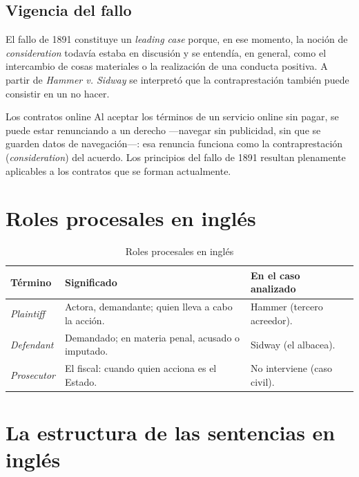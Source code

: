 \documentclass[12pt,oneside]{book}
\begin{document}
\subsection{Vigencia del fallo}

El fallo de 1891 constituye un \textit{leading case} porque, en ese momento, la noción de \textit{consideration} todavía estaba en discusión y se entendía, en general, como el intercambio de cosas materiales o la realización de una conducta positiva. A partir de \textit{Hammer v. Sidway} se interpretó que la contraprestación también puede consistir en un no hacer.

\begin{example}{Los contratos online}
Al aceptar los términos de un servicio online sin pagar, se puede estar renunciando a un derecho ---navegar sin publicidad, sin que se guarden datos de navegación---: esa renuncia funciona como la contraprestación (\textit{consideration}) del acuerdo. Los principios del fallo de 1891 resultan plenamente aplicables a los contratos que se forman actualmente.
\end{example}

\section{Roles procesales en inglés}

\begin{table}[H]
\centering
\caption{Roles procesales en inglés}
\begin{tabularx}{\textwidth}{>{\raggedright\arraybackslash}p{} >{\raggedright\arraybackslash}X >{\raggedright\arraybackslash}p{}}
\toprule
\textbf{Término} & \textbf{Significado} & \textbf{En el caso analizado} \\
\midrule
\textit{Plaintiff} & Actora, demandante; quien lleva a cabo la acción. & Hammer (tercero acreedor). \\
\textit{Defendant} & Demandado; en materia penal, acusado o imputado. & Sidway (el albacea). \\
\textit{Prosecutor} & El fiscal: cuando quien acciona es el Estado. & No interviene (caso civil). \\
\bottomrule
\end{tabularx}
\end{table}

\section{La estructura de las sentencias en inglés}
\end{document}
